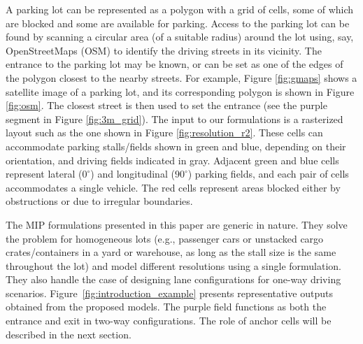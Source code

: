 \documentclass[10pt]{article}
\theoremstyle{definition}
\begin{document}
A parking lot can be represented as a polygon with a grid of cells, some of which are blocked and some are available for parking. Access to the parking lot can be found by scanning a circular area (of a suitable radius) around the lot using, say, OpenStreetMaps (OSM) to identify the driving streets in its vicinity. The entrance to the parking lot may be known, or can be set as one of the edges of the polygon closest to the nearby streets. For example, Figure \ref{fig:gmaps} shows a satellite image of a parking lot, and its corresponding polygon is shown in Figure \ref{fig:osm}. The closest street is then used to set the entrance (see the purple segment in Figure \ref{fig:3m_grid}). The input to our formulations is a rasterized layout such as the one shown in Figure \ref{fig:resolution_r2}. These cells can accommodate parking stalls/fields shown in green and blue, depending on their orientation, and driving fields indicated in gray. Adjacent green and blue cells represent lateral ($0^{\circ}$) and longitudinal ($90^{\circ}$) parking fields, and each pair of cells accommodates a single vehicle. The red cells represent areas blocked either by obstructions or due to irregular boundaries.


The MIP formulations presented in this paper are generic in nature. They solve the problem for homogeneous lots (e.g., passenger cars or unstacked cargo crates/containers in a yard or warehouse, as long as the stall size is the same throughout the lot) and model different resolutions using a single formulation. They also handle the case of designing lane configurations for one-way driving scenarios. Figure~\ref{fig:introduction_example} presents representative outputs obtained from the proposed models. The purple field functions as both the entrance and exit in two-way configurations. The role of anchor cells will be described in the next section.
\end{document}
